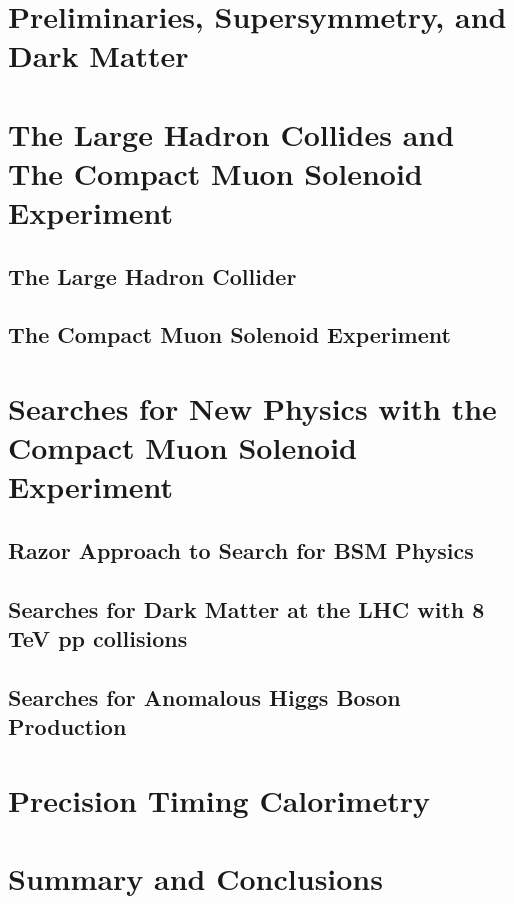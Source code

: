 \documentclass[14pt]{caltech_thesis}
\begin{document}
\tableofcontents
\listoffigures
\listoftables
\printnomenclature

\mainmatter
\part{Preliminaries, Supersymmetry, and Dark Matter}

\part{The Large Hadron Collides and The Compact Muon Solenoid Experiment}
\chapter{The Large Hadron Collider}

\chapter{The Compact Muon Solenoid Experiment}

\part{ Searches for New Physics with the Compact Muon Solenoid
  Experiment}

\chapter{Razor Approach to Search for BSM Physics}

\chapter{Searches for Dark Matter at the LHC with 8 TeV pp collisions}\label{DMatLHC}

\chapter{Searches for Anomalous Higgs Boson Production}\label{HggRazor}

\part{ Precision Timing Calorimetry}

\part{Summary and Conclusions}

\end{document}
